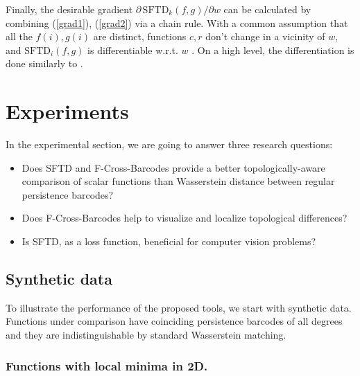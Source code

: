 \documentclass[runningheads]{llncs}
\begin{document}
\fi

Finally, the desirable gradient $\partial \,\mbox{SFTD}_k (f, g) / \partial w$ can be calculated by combining (\ref{grad1}), (\ref{grad2}) via a chain rule.
With a common assumption that all the $f(i), g(i)$ are distinct, functions $c, r$ don't change in a vicinity of $w$, and $\mbox{SFTD}_i(f, g)$ is differentiable w.r.t. $w$ \cite{hofer2020graph, carriere2021optimizing}.
On a high level, the differentiation is done similarly to
\cite{carriere2021optimizing, trofimov2023learning}.  



\section{Experiments}

In the experimental section, we are going to answer three research questions:
\begin{itemize}
\item[\textbf{Q1:}]  Does SFTD and F-Cross-Barcodes provide a better topologically-aware comparison of scalar functions than Wasserstein distance between regular persistence barcodes?
\item[\textbf{Q2:}] Does F-Cross-Barcodes help to visualize and localize topological differences?
\item[\textbf{Q3:}] Is SFTD, as a loss function, beneficial for computer vision problems? 
\end{itemize}

\subsection{Synthetic data}

To illustrate the performance of the proposed tools, we start with synthetic data. %
Functions under comparison have coinciding persistence barcodes of all degrees and they are indistinguishable by standard Wasserstein matching.

\subsubsection{Functions with local minima in 2D.}
\end{document}
